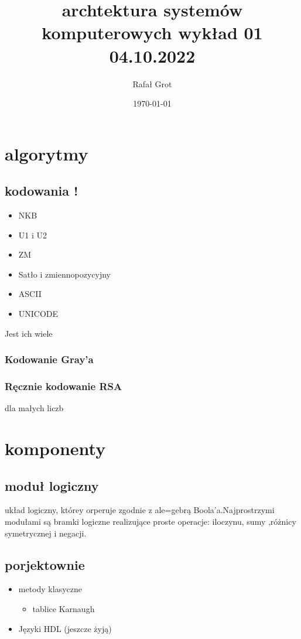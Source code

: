 \documentclass[11pt]{article}
\author{Rafał Grot}
\date{\today}
\title{archtektura systemów komputerowych wykład 01 04.10.2022}
\begin{document}
\maketitle
\tableofcontents

\section{algorytmy}
\label{sec:orge06ad23}
\subsection{kodowania !}
\label{sec:org741eee4}
\begin{itemize}
\item NKB
\item U1 i U2
\item ZM
\item Satło i zmiennopozycyjny
\item ASCII
\item UNICODE
\end{itemize}
Jest ich wiele
\subsubsection{Kodowanie Gray'a}
\label{sec:org257998b}
\subsubsection{Ręcznie kodowanie RSA}
\label{sec:orged6e462}
dla małych liczb
\section{komponenty}
\label{sec:org69f8295}
\subsection{moduł logiczny}
\label{sec:orgc982346}
układ logiczny, którey orperuje zgodnie z ale=gebrą Boola'a.Najprostrzymi modułami są bramki logiczne realizujące proste operacje: iloczynu, sumy ,różnicy symetrycznej i negacji.
\subsection{porjektownie}
\label{sec:org0321c2a}
\begin{itemize}
\item metody klasyczne
\begin{itemize}
\item tablice Karnaugh
\end{itemize}
\item Języki HDL
(jeszcze żyją)
\end{itemize}
\end{document}
